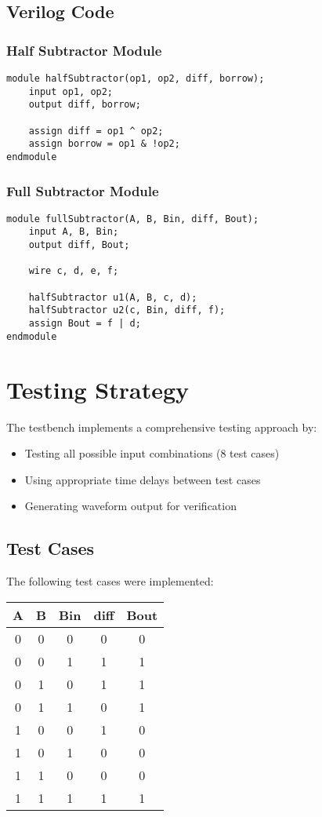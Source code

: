 \documentclass[12pt]{article}
\begin{document}
\subsection{Verilog Code}
\subsubsection{Half Subtractor Module}
\begin{lstlisting}[style=verilog]
module halfSubtractor(op1, op2, diff, borrow);
    input op1, op2;
    output diff, borrow;
    
    assign diff = op1 ^ op2;
    assign borrow = op1 & !op2;
endmodule
\end{lstlisting}

\subsubsection{Full Subtractor Module}
\begin{lstlisting}[style=verilog]
module fullSubtractor(A, B, Bin, diff, Bout);
    input A, B, Bin;
    output diff, Bout;
    
    wire c, d, e, f;
    
    halfSubtractor u1(A, B, c, d);
    halfSubtractor u2(c, Bin, diff, f);
    assign Bout = f | d;
endmodule
\end{lstlisting}

\section{Testing Strategy}
The testbench implements a comprehensive testing approach by:
\begin{itemize}
    \item Testing all possible input combinations (8 test cases)
    \item Using appropriate time delays between test cases
    \item Generating waveform output for verification
\end{itemize}

\subsection{Test Cases}
The following test cases were implemented:
\begin{center}
\begin{tabular}{|c|c|c|c|c|}
\hline
A & B & Bin & diff & Bout \\
\hline
0 & 0 & 0 & 0 & 0 \\
0 & 0 & 1 & 1 & 1 \\
0 & 1 & 0 & 1 & 1 \\
0 & 1 & 1 & 0 & 1 \\
1 & 0 & 0 & 1 & 0 \\
1 & 0 & 1 & 0 & 0 \\
1 & 1 & 0 & 0 & 0 \\
1 & 1 & 1 & 1 & 1 \\
\hline
\end{tabular}
\end{center}
\end{document}
